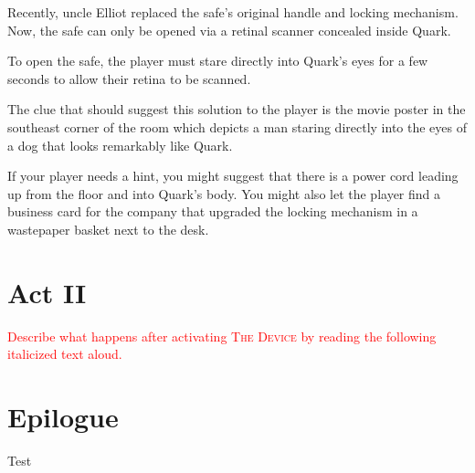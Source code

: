 \documentclass[a6paper, parskip=half, DIV=14, 12pt]{scrartcl}
\begin{document}
Recently, uncle Elliot replaced the safe's original handle and locking mechanism.
Now, the safe can only be opened via a retinal scanner concealed inside Quark.

To open the safe, the player must stare directly into Quark's eyes for a few seconds to allow their retina to be scanned.

The clue that should suggest this solution to the player is the movie poster in the southeast corner of the room which depicts a man staring directly into the eyes of a dog that looks remarkably like Quark.

If your player needs a hint, you might suggest that there is a power cord leading up from the floor and into Quark's body.
You might also let the player find a business card for the company that upgraded the locking mechanism in a wastepaper basket next to the desk. 

\newpage

\section*{Act II}
\textcolor{Red}{Describe what happens after activating \textsc{The Device} by reading the following italicized text aloud.}


\section*{Epilogue}
Test

%
%
%
%
%
%
%
%
%
%
%
%
%
%
%
%
%
%
%
%
\end{document}
